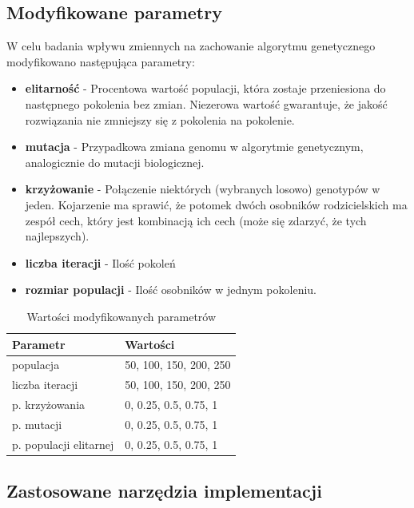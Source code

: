 \documentclass{article}
\begin{document}
\subsection{Modyfikowane parametry}

W celu badania wpływu zmiennych na zachowanie algorytmu genetycznego modyfikowano następująca parametry:

\begin{itemize}
\item \textbf{elitarność} - Procentowa wartość populacji, która zostaje przeniesiona do następnego pokolenia bez zmian. Niezerowa wartość gwarantuje, że jakość rozwiązania nie zmniejszy się z pokolenia na pokolenie.

\item \textbf{mutacja} - Przypadkowa zmiana genomu w algorytmie genetycznym, analogicznie do mutacji biologicznej.

\item \textbf{krzyżowanie} -  Połączenie niektórych (wybranych losowo) genotypów w jeden. Kojarzenie ma sprawić, że potomek dwóch osobników rodzicielskich ma zespół cech, który jest kombinacją ich cech (może się zdarzyć, że tych najlepszych).

\item \textbf{liczba iteracji} - Ilość pokoleń  
\item \textbf{rozmiar populacji} - Ilość osobników w jednym pokoleniu.
\end{itemize}


\begin{table}[!htbp]
\centering
\caption{Wartości modyfikowanych parametrów}
\label{my-label}
\begin{tabular}{|l|l|}
\hline
\rowcolor[HTML]{C0C0C0} 
\textbf{Parametr}      & \textbf{Wartości}      \\ \hline
populacja              & 50, 100, 150, 200, 250 \\ \hline
liczba iteracji        & 50, 100, 150, 200, 250 \\ \hline
p. krzyżowania         & 0, 0.25, 0.5, 0.75, 1  \\ \hline
p. mutacji             & 0, 0.25, 0.5, 0.75, 1  \\ \hline
p. populacji elitarnej & 0, 0.25, 0.5, 0.75, 1  \\ \hline
\end{tabular}
\end{table}


\subsection{Zastosowane narzędzia implementacji}
\end{document}
